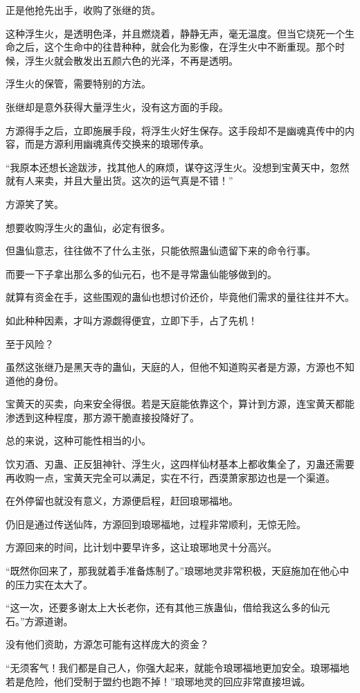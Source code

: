 \begin{this_body}
正是他抢先出手，收购了张继的货。

这种浮生火，是透明色泽，并且燃烧着，静静无声，毫无温度。但当它烧死一个生命之后，这个生命中的往昔种种，就会化为影像，在浮生火中不断重现。那个时候，浮生火就会散发出五颜六色的光泽，不再是透明。

浮生火的保管，需要特别的方法。

张继却是意外获得大量浮生火，没有这方面的手段。

方源得手之后，立即施展手段，将浮生火好生保存。这手段却不是幽魂真传中的内容，而是方源利用幽魂真传交换来的琅琊传承。

“我原本还想长途跋涉，找其他人的麻烦，谋夺这浮生火。没想到宝黄天中，忽然就有人来卖，并且大量出货。这次的运气真是不错！”

方源笑了笑。

想要收购浮生火的蛊仙，必定有很多。

但蛊仙意志，往往做不了什么主张，只能依照蛊仙遗留下来的命令行事。

而要一下子拿出那么多的仙元石，也不是寻常蛊仙能够做到的。

就算有资金在手，这些围观的蛊仙也想讨价还价，毕竟他们需求的量往往并不大。

如此种种因素，才叫方源觑得便宜，立即下手，占了先机！

至于风险？

虽然这张继乃是黑天寺的蛊仙，天庭的人，但他不知道购买者是方源，方源也不知道他的身份。

宝黄天的买卖，向来安全得很。若是天庭能依靠这个，算计到方源，连宝黄天都能渗透到这种程度，那方源干脆直接投降好了。

总的来说，这种可能性相当的小。

饮刃酒、刃蛊、正反狙神针、浮生火，这四样仙材基本上都收集全了，刃蛊还需要再收购一点，宝黄天完全可以满足，实在不行，西漠萧家那边也是一个渠道。

在外停留也就没有意义，方源便启程，赶回琅琊福地。

仍旧是通过传送仙阵，方源回到琅琊福地，过程非常顺利，无惊无险。

方源回来的时间，比计划中要早许多，这让琅琊地灵十分高兴。

“既然你回来了，那我就着手准备炼制了。”琅琊地灵非常积极，天庭施加在他心中的压力实在太大了。

“这一次，还要多谢太上大长老你，还有其他三族蛊仙，借给我这么多的仙元石。”方源道谢。

没有他们资助，方源怎可能有这样庞大的资金？

“无须客气！我们都是自己人，你强大起来，就能令琅琊福地更加安全。琅琊福地若是危险，他们受制于盟约也跑不掉！”琅琊地灵的回应非常直接坦诚。


\end{this_body}
